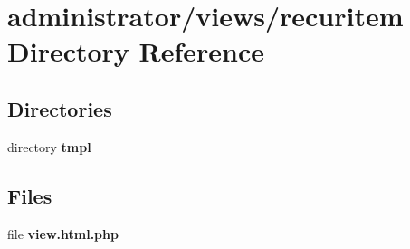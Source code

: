 \section{administrator/views/recuritem Directory Reference}
\label{dir_a2d41de37a8e7174075eb81848e6c514}
\subsection*{Directories}
\begin{DoxyCompactItemize}
\item 
directory \textbf{ tmpl}
\end{DoxyCompactItemize}
\subsection*{Files}
\begin{DoxyCompactItemize}
\item 
file \textbf{ view.\+html.\+php}
\end{DoxyCompactItemize}

